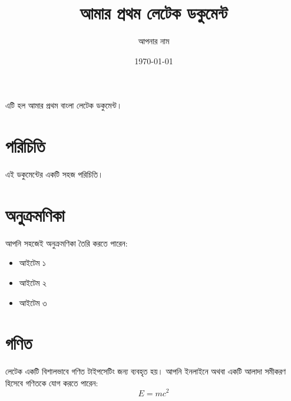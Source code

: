 \documentclass{article}
\title{আমার প্রথম লেটেক ডকুমেন্ট}
\author{আপনার নাম}
\date{\today}
\begin{document}
\maketitle

এটি হল আমার প্রথম বাংলা লেটেক ডকুমেন্ট।

\section{পরিচিতি}
এই ডকুমেন্টের একটি সহজ পরিচিতি।

\section{অনুক্রমণিকা}
আপনি সহজেই অনুক্রমণিকা তৈরি করতে পারেন:
\begin{itemize}
    \item আইটেম ১
    \item আইটেম ২
    \item আইটেম ৩
\end{itemize}

\section{গণিত}
লেটেক একটি বিশালভাবে গণিত টাইপসেটিং জন্য ব্যবহৃত হয়। আপনি ইনলাইনে অথবা একটি আলাদা সমীকরণ হিসেবে গণিতকে যোগ করতে পারেন:
\[ E=mc^2 \]
\end{document}
